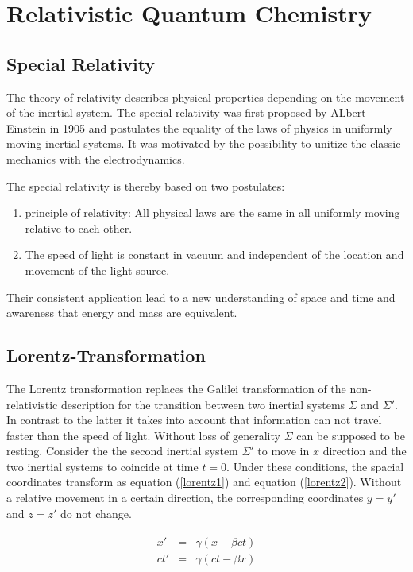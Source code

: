 \chapter{Relativistic Quantum Chemistry}
\section{Special Relativity}

The theory of relativity describes physical properties depending on the movement
of the inertial system.
The special relativity was first proposed
by ALbert Einstein in 1905 \cite{Einstein05} and postulates the equality of
the laws of physics in uniformly moving inertial systems.
It was motivated by the possibility to unitize the classic mechanics with
the electrodynamics.

The special relativity is thereby based on two postulates:
\begin{enumerate}
\item principle of relativity: All physical laws are the same in all uniformly
      moving relative to each other.
\item The speed of light is constant in vacuum and independent of the location
      and movement of the light source.
\end{enumerate}

Their consistent application lead to a new understanding of space and time
and awareness that energy and mass are equivalent.\cite{nolting4}


\section{Lorentz-Transformation}
The Lorentz transformation replaces the Galilei transformation of the
non-relativistic description for the transition between two inertial systems
$\Sigma$ and $\Sigma'$.
In contrast to the latter it takes into account that information can not travel
faster than the speed of light.
Without loss of generality $\Sigma$ can be supposed to be resting. Consider the
the second inertial system $\Sigma'$ to move in $x$ direction and the two
inertial systems to coincide at time $t=0$. Under these conditions, the spacial
coordinates transform as equation (\ref{lorentz1}) and equation (\ref{lorentz2}).
Without a relative movement in a certain direction, the corresponding coordinates
$y=y'$ and $z=z'$ do not change.

\begin{eqnarray}\begin{array}{rcl}\label{lorentz1}
 x'  &=& \gamma\left(x-\beta ct\right)\\
 ct' &=& \gamma\left(ct-\beta x\right)
\end{array}\end{eqnarray}

